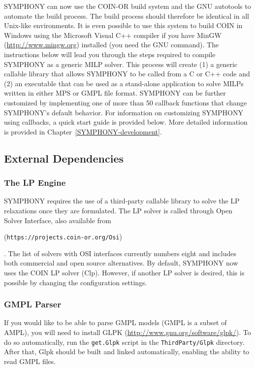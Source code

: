 SYMPHONY can now use the COIN-OR build system and the GNU autotools to
automate the build process. The build process should therefore be identical in
all Unix-like environments. It is even possible to use this system to build
COIN in Windows using the Microsoft Visual C++ compiler if you have MinGW
(\url{http://www.mingw.org}) installed (you need the GNU  command).
The instructions below will lead you through the steps required to compile
SYMPHONY as a generic MILP solver. This process will create (1) a generic
callable library that allows SYMPHONY to be called from a C or C++ code and
(2) an executable that can be used as a stand-alone application to solve MILPs
written in either MPS or GMPL file format. SYMPHONY can be further customized
by implementing one of more than 50 callback functions that change SYMPHONY's
default behavior. For information on customizing SYMPHONY using callbacks, a
quick start guide is provided below. More detailed information is provided in
Chapter~\ref{SYMPHONY-development}.

\subsection{External Dependencies}

\subsubsection{The LP Engine} SYMPHONY requires the use of a third-party
  callable library to solve the LP relaxations once they are formulated. The
LP solver is called through Open Solver Interface, also available from
\begin{latexonly} 
(\texttt{https://projects.coin-or.org/Osi})
\end{latexonly}.
The list of solvers with OSI interfaces currently numbers eight and includes
both commercial and open source alternatives. By default, SYMPHONY now uses
the COIN LP solver (Clp). However, if another LP solver is desired, this is
possible by changing the configuration settings.

\subsubsection{GMPL Parser} If you would like to be able to parse GMPL models
(GMPL is a subset of AMPL), you will need to install GLPK
(\url{http://www.gnu.org/software/glpk/}). To do so automatically, run the
\texttt{get.Glpk} script in the \texttt{ThirdParty/Glpk} directory. After
that, Glpk should be built and linked automatically, enabling the ability to
read GMPL files.

